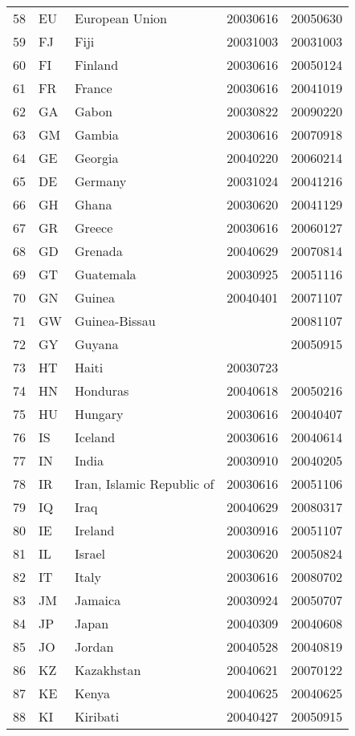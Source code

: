 \begin{longtable}{rllrr}
  58 & EU & European Union & 20030616 & 20050630 \\ 
  59 & FJ & Fiji & 20031003 & 20031003 \\ 
  60 & FI & Finland & 20030616 & 20050124 \\ 
  61 & FR & France & 20030616 & 20041019 \\ 
  62 & GA & Gabon & 20030822 & 20090220 \\ 
  63 & GM & Gambia & 20030616 & 20070918 \\ 
  64 & GE & Georgia & 20040220 & 20060214 \\ 
  65 & DE & Germany & 20031024 & 20041216 \\ 
  66 & GH & Ghana & 20030620 & 20041129 \\ 
  67 & GR & Greece & 20030616 & 20060127 \\ 
  68 & GD & Grenada & 20040629 & 20070814 \\ 
  69 & GT & Guatemala & 20030925 & 20051116 \\ 
  70 & GN & Guinea & 20040401 & 20071107 \\ 
  71 & GW & Guinea-Bissau &  & 20081107 \\ 
  72 & GY & Guyana &  & 20050915 \\ 
  73 & HT & Haiti & 20030723 &  \\ 
  74 & HN & Honduras & 20040618 & 20050216 \\ 
  75 & HU & Hungary & 20030616 & 20040407 \\ 
  76 & IS & Iceland & 20030616 & 20040614 \\ 
  77 & IN & India & 20030910 & 20040205 \\ 
  78 & IR & Iran, Islamic Republic of & 20030616 & 20051106 \\ 
  79 & IQ & Iraq & 20040629 & 20080317 \\ 
  80 & IE & Ireland & 20030916 & 20051107 \\ 
  81 & IL & Israel & 20030620 & 20050824 \\ 
  82 & IT & Italy & 20030616 & 20080702 \\ 
  83 & JM & Jamaica & 20030924 & 20050707 \\ 
  84 & JP & Japan & 20040309 & 20040608 \\ 
  85 & JO & Jordan & 20040528 & 20040819 \\ 
  86 & KZ & Kazakhstan & 20040621 & 20070122 \\ 
  87 & KE & Kenya & 20040625 & 20040625 \\ 
  88 & KI & Kiribati & 20040427 & 20050915 \\ 

\end{longtable}
